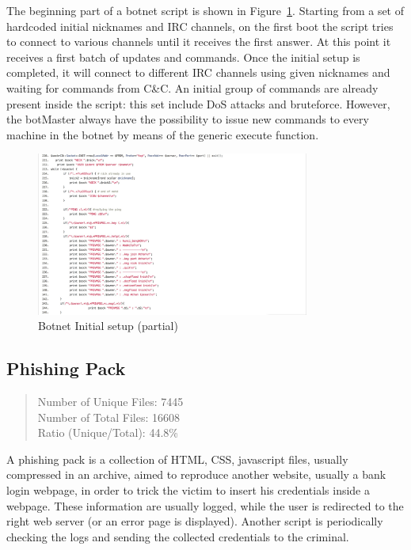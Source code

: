 The beginning part of a botnet script is shown in Figure~\ref{fig:botnet}. Starting from a set of hardcoded initial nicknames and IRC channels, on the first boot the script tries to connect to various channels until it receives the first answer. At this point it receives a first batch of updates and commands. Once the initial setup is completed, it will connect to different IRC channels using given nicknames and waiting for commands from C\&C. An initial group of commands are already present inside the script: this set include DoS attacks and bruteforce. However, the botMaster always have the possibility to issue new commands to every machine in the botnet by means of the generic execute function.

\begin{figure}[H]
\centerline{\includegraphics[width=0.8\textwidth]{Images/botnet.jpg}}
\caption{Botnet Initial setup (partial)\label{fig:botnet}}
\end{figure}

\subsection{Phishing Pack}

\begin{quote}
Number of Unique Files: 7445\\
Number of Total Files: 16608\\
Ratio (Unique/Total): 44.8\%
\end{quote}

A phishing pack is a collection of HTML, CSS, javascript files, usually compressed in an archive, aimed to reproduce another website, usually a bank login webpage, in order to trick the victim to insert his credentials inside a webpage. These information are usually logged, while the user is redirected to the right web server (or an error page is displayed). Another script is periodically checking the logs and sending the collected credentials to the criminal.

